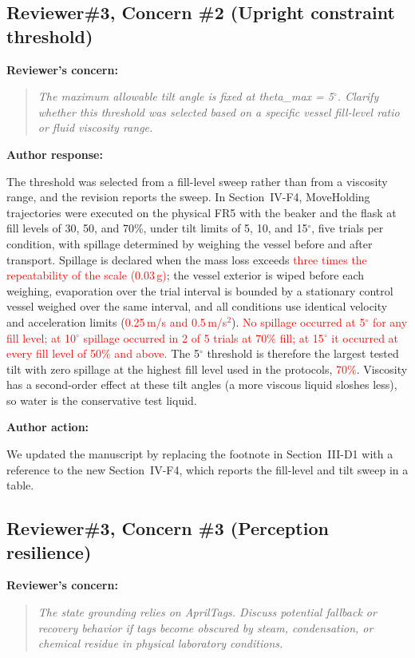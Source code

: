 \documentclass[11pt]{article}
\newcommand{\nd}[1]{\textcolor{red}{#1}}
\newif\ifshowstatus
\newcommand{\statusline}[2]{\ifshowstatus\par\noindent\textcolor{status#1}{\textbf{Status: \MakeUppercase{#1}.} #2}\par\smallskip\fi}
\newenvironment{concern}[3][pending]{\subsection*{\ifshowstatus\textcolor{status#1}{#2}\else#2\fi}\statusline{#1}{#3}\textbf{Reviewer's concern:}\begin{quote}\itshape}{\end{quote}}
\newenvironment{response}{\textbf{Author response:}\par\smallskip}{\par\medskip}
\newenvironment{action}{\textbf{Author action:}\par\smallskip}{\par\bigskip\noindent\hrulefill\par\bigskip}
\begin{document}
\begin{concern}[pending]{Reviewer\#3, Concern \#2 (Upright constraint threshold)}{Needs A4 (fill-level and tilt spill sweep).}
The maximum allowable tilt angle is fixed at theta\_max = 5$^\circ$.
Clarify whether this threshold was selected based on a specific vessel fill-level ratio or fluid viscosity range.
\end{concern}

\begin{response}
The threshold was selected from a fill-level sweep rather than from a viscosity range, and the revision reports the sweep.
In Section~IV-F4, MoveHolding trajectories were executed on the physical FR5 with the beaker and the flask at fill levels of 30, 50, and 70\%, under tilt limits of 5, 10, and 15$^\circ$, five trials per condition, with spillage determined by weighing the vessel before and after transport.
Spillage is declared when the mass loss exceeds \nd{three times the repeatability of the scale (0.03\,g)}; the vessel exterior is wiped before each weighing, evaporation over the trial interval is bounded by a stationary control vessel weighed over the same interval, and all conditions use identical velocity and acceleration limits (\nd{0.25\,m/s and 0.5\,m/s$^2$}).
\nd{No spillage occurred at 5$^\circ$ for any fill level; at 10$^\circ$ spillage occurred in 2 of 5 trials at 70\% fill; at 15$^\circ$ it occurred at every fill level of 50\% and above.}
The 5$^\circ$ threshold is therefore the largest tested tilt with zero spillage at the highest fill level used in the protocols, \nd{70\%}.
Viscosity has a second-order effect at these tilt angles (a more viscous liquid sloshes less), so water is the conservative test liquid.
\end{response}

\begin{action}
We updated the manuscript by replacing the footnote in Section~III-D1 with a reference to the new Section~IV-F4, which reports the fill-level and tilt sweep in a table.
\end{action}

\begin{concern}[pending]{Reviewer\#3, Concern \#3 (Perception resilience)}{Needs the A1 occlusion numbers and A5 (fallback policy implemented exactly as described).}
The state grounding relies on AprilTags.
Discuss potential fallback or recovery behavior if tags become obscured by steam, condensation, or chemical residue in physical laboratory conditions.
\end{concern}
\end{document}
